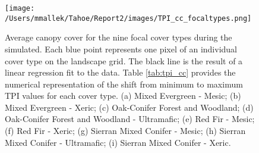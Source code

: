 \begin{figure}[!htbp]
\centering
\texttt{[image: /Users/mmallek/Tahoe/Report2/images/TPI\_cc\_focaltypes.png]}
\label{fig:tpi_cc_focaltypes}
\caption{Average canopy cover for the nine focal cover types during the simulated. Each blue point represents one pixel of an individual cover type on the landscape grid. The black line is the result of a linear regression fit to the data. Table \ref{tab:tpi_cc} provides the numerical representation of the shift from minimum to maximum TPI values for each cover type. (a) Mixed Evergreen - Mesic; (b) Mixed Evergreen - Xeric; (c) Oak-Conifer Forest and Woodland; (d) Oak-Conifer Forest and Woodland - Ultramafic; (e) Red Fir - Mesic; (f) Red Fir - Xeric; (g) Sierran Mixed Conifer - Mesic; (h) Sierran Mixed Conifer - Ultramafic; (i) Sierran Mixed Conifer - Xeric.}
\label{fig:tpi_cc}
\end{figure}


